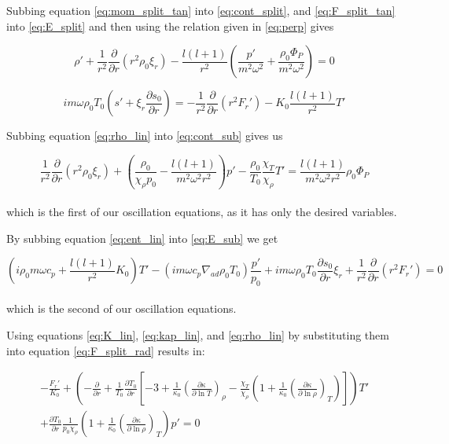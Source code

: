 \documentclass[11pt]{amsart}
\begin{document}
Subbing equation \ref{eq:mom_split_tan} into \ref{eq:cont_split}, and \ref{eq:F_split_tan} into \ref{eq:E_split} and then using
the relation given in \ref{eq:perp} gives

\begin{equation} \label{eq:cont_sub}
\rho' + \frac{1}{r^{2}} \frac{\partial}{\partial r} ( r^{2} \rho_{0} \xi_{r} ) - \frac{l (l+1)}{r^{2}} \left( \frac{p'}{m^{2} \omega^{2}} + \frac{\rho_{0} \Phi_{P}}{m^{2} \omega^{2}} \right) = 0
\end{equation}

\begin{equation} \label{eq:E_sub}
i m \omega \rho_{0} T_{0} \left( s' + \xi_{r} \frac{\partial s_{0}}{\partial r} \right)
= - \frac{1}{r^{2}} \frac{\partial}{\partial r} ( r^{2} F_{r}') - K_{0} \frac{l (l+1)}{r^{2}} T'
\end{equation}

Subbing equation \ref{eq:rho_lin} into \ref{eq:cont_sub} gives us

\begin{equation} \label{eq:cont_osc}
\frac{1}{r^{2}} \frac{\partial}{\partial r} ( r^{2} \rho_{0} \xi_{r} )  
+ \left( \frac{\rho_{0}}{\chi_{\rho} p_{0}} - \frac{l (l+1)}{m^{2} \omega^{2} r^{2}} \right) p'
- \frac{\rho_{0}}{T_{0}} \frac{\chi_{T}}{\chi_{\rho}} T'
=
\frac{l (l+1)}{m^{2} \omega^{2} r^{2}} \rho_{0} \Phi_{P}
\end{equation}
\\
which is the first of our oscillation equations, as it has only the desired variables.

By subbing equation \ref{eq:ent_lin} into \ref{eq:E_sub} we get

\begin{equation} \label{eq:ent_osc}
\left( i \rho_{0} m \omega c_{p}  + \frac{l (l+1)}{r^{2}} K_{0} \right) T'
- \left( i m \omega c_{p} \nabla_{ad} \rho_{0} T_{0}  \right) \frac{p'}{p_{0}}
+ i m \omega \rho_{0} T_{0} \frac{\partial s_{0}}{\partial r} \xi_{r}
+ \frac{1}{r^{2}} \frac{\partial}{\partial r} ( r^{2} F_{r}')
=
0
\end{equation}
\\
which is the second of our oscillation equations.

Using equations \ref{eq:K_lin}, \ref{eq:kap_lin}, and \ref{eq:rho_lin} by substituting them into equation \ref{eq:F_split_rad} results in:

\begin{multline} \label{eq:flux_osc}
- \frac{F_{r}'}{K_{0}}
+ \left( - \frac{\partial}{\partial r} + \frac{1}{T_{0}} \frac{\partial T_{0}}{\partial r} \left[ -3 + \frac{1}{\kappa_{0}} \left( \frac{\partial \kappa}{\partial \ln T} \right)_{\rho} - \frac{\chi_{T}}{\chi_{\rho}} \left( 1 + \frac{1}{\kappa_{0}} \left( \frac{\partial \kappa}{\partial \ln \rho} \right)_{T} \right) \right] \right) T' \\
+ \frac{\partial T_{0}}{\partial r} \frac{1}{p_{0} \chi_{\rho}} \left( 1 + \frac{1}{\kappa_{0}} \left( \frac{\partial \kappa}{\partial \ln \rho} \right)_{T} \right) p'
=
0
\end{multline}
\end{document}
